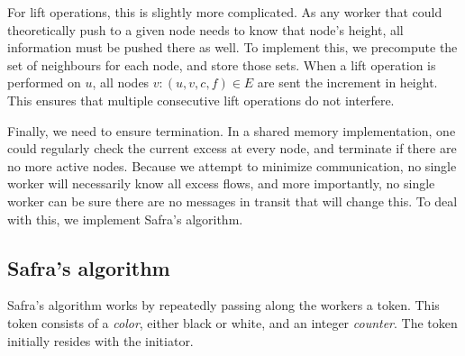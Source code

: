 For lift operations, this is slightly more complicated. As any worker that could theoretically push to a given node needs to know that node's height, all information must be pushed there as well. To implement this, we precompute the set of neighbours for each node, and store those sets. When a lift operation is performed on $u$, all nodes $v : (u, v, c, f) \in E$ are sent the increment in height. This ensures that multiple consecutive lift operations do not interfere.

Finally, we need to ensure termination. In a shared memory implementation, one could regularly check the current excess at every node, and terminate if there are no more active nodes. Because we attempt to minimize communication, no single worker will necessarily know all excess flows, and more importantly, no single worker can be sure there are no messages in transit that will change this. To deal with this, we implement Safra's algorithm.

\subsection{Safra's algorithm}

Safra's algorithm\cite{fokkink2013distributed} works by repeatedly passing along the workers a token. This token consists of a \emph{color}, either black or white, and an integer \emph{counter}. The token initially resides with the initiator.




